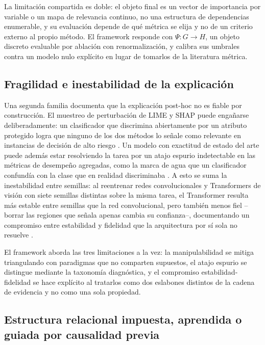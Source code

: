 La limitación compartida es doble: el objeto final es un vector de importancia por variable o un mapa de relevancia continuo, no una estructura de dependencias enumerable, y su evaluación depende de qué métrica se elija y no de un criterio externo al propio método. El framework responde con $\Psi: G\to H$, un objeto discreto evaluable por ablación con renormalización, y calibra sus umbrales contra un modelo nulo explícito en lugar de tomarlos de la literatura métrica.

\subsection{Fragilidad e inestabilidad de la explicación}

Una segunda familia documenta que la explicación post-hoc no es fiable por construcción. El muestreo de perturbación de LIME y SHAP puede engañarse deliberadamente: un clasificador que discrimina abiertamente por un atributo protegido logra que ninguno de los dos métodos lo señale como relevante en instancias de decisión de alto riesgo \cite{slack2020fooling}. Un modelo con exactitud de estado del arte puede además estar resolviendo la tarea por un atajo espurio indetectable en las métricas de desempeño agregadas, como la marca de agua que un clasificador confundía con la clase que en realidad discriminaba \cite{lapuschkin2019unmasking}. A esto se suma la inestabilidad entre semillas: al reentrenar redes convolucionales y Transformers de visión con siete semillas distintas sobre la misma tarea, el Transformer resulta más estable entre semillas que la red convolucional, pero también menos fiel --borrar las regiones que señala apenas cambia su confianza--, documentando un compromiso entre estabilidad y fidelidad que la arquitectura por sí sola no resuelve \cite{keratoconus2026instability}.

El framework aborda las tres limitaciones a la vez: la manipulabilidad se mitiga triangulando con paradigmas que no comparten supuestos, el atajo espurio se distingue mediante la taxonomía diagnóstica, y el compromiso estabilidad-fidelidad se hace explícito al tratarlos como dos eslabones distintos de la cadena de evidencia y no como una sola propiedad.

\subsection{Estructura relacional impuesta, aprendida o guiada por causalidad previa}

